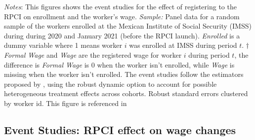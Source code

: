 \documentclass[oneside,11pt]{article}
\begin{document}
\scriptsize{
\noindent \textit{Notes}: This figures shows the event studies for the effect of registering to the RPCI on enrollment and the worker's wage. \textit{Sample:} Panel data for a random sample of the workers enrolled at the Mexican Institute of Social Security (IMSS) during during 2020 and January 2021 (before the RPCI launch). \textit{Enrolled} is a dummy variable where 1 means worker $i$ was enrolled at IMSS during period $t$. $\dagger$ \textit{Formal Wage} and \textit{Wage} are the registered wage for worker $i$ during period $t$, the difference is \textit{Formal Wage} is 0 when the worker isn't enrolled, while \textit{Wage} is missing when the worker isn't enrolled. The event studies follow the estimators proposed by \cite{de2020two}, using the robust dynamic option to account for possible heterogeneous treatment effects across cohorts. Robust standard errors clustered by worker id. This figure is referenced in %
}

\clearpage

\subsection{Event Studies: RPCI effect on wage changes}
\end{document}
